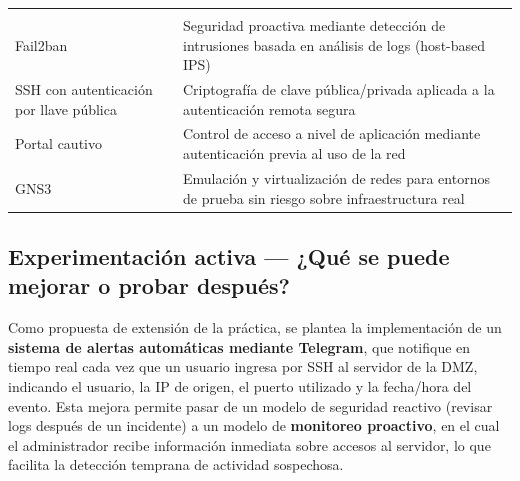 \documentclass{article}
\renewcommand{\_}{\oldunderscore\hskip0pt\relax}
\begin{document}
\begin{longtable}[]{@{}ll@{}}
\begin{minipage}[t]{0.48\columnwidth}
\end{minipage}\tabularnewline
\begin{minipage}[t]{0.48\columnwidth}\raggedright
Fail2ban\strut
\end{minipage} & \begin{minipage}[t]{0.48\columnwidth}\raggedright
Seguridad proactiva mediante detección de intrusiones basada en análisis
de logs (host-based IPS)\strut
\end{minipage}\tabularnewline
\begin{minipage}[t]{0.48\columnwidth}\raggedright
SSH con autenticación por llave pública\strut
\end{minipage} & \begin{minipage}[t]{0.48\columnwidth}\raggedright
Criptografía de clave pública/privada aplicada a la autenticación remota
segura\strut
\end{minipage}\tabularnewline
\begin{minipage}[t]{0.48\columnwidth}\raggedright
Portal cautivo\strut
\end{minipage} & \begin{minipage}[t]{0.48\columnwidth}\raggedright
Control de acceso a nivel de aplicación mediante autenticación previa al
uso de la red\strut
\end{minipage}\tabularnewline
\begin{minipage}[t]{0.48\columnwidth}\raggedright
GNS3\strut
\end{minipage} & \begin{minipage}[t]{0.48\columnwidth}\raggedright
Emulación y virtualización de redes para entornos de prueba sin riesgo
sobre infraestructura real\strut
\end{minipage}\tabularnewline
\bottomrule
\end{longtable}

\hypertarget{experimentaciuxf3n-activa-quuxe9-se-puede-mejorar-o-probar-despuuxe9s}{%
\subsection{Experimentación activa --- ¿Qué se puede mejorar o probar
después?}\label{experimentaciuxf3n-activa-quuxe9-se-puede-mejorar-o-probar-despuuxe9s}}

Como propuesta de extensión de la práctica, se plantea la implementación
de un \textbf{sistema de alertas automáticas mediante Telegram}, que
notifique en tiempo real cada vez que un usuario ingresa por SSH al
servidor de la DMZ, indicando el usuario, la IP de origen, el puerto
utilizado y la fecha/hora del evento. Esta mejora permite pasar de un
modelo de seguridad reactivo (revisar logs después de un incidente) a un
modelo de \textbf{monitoreo proactivo}, en el cual el administrador
recibe información inmediata sobre accesos al servidor, lo que facilita
la detección temprana de actividad sospechosa.
\end{document}
